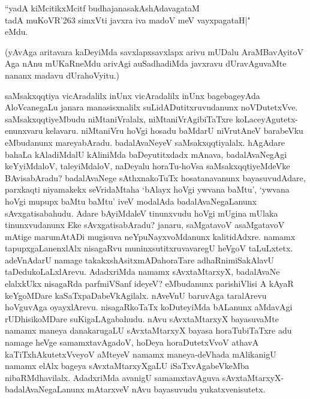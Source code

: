  \begin{shloka}
 ``yadA kiMcitikxMcitf budhajanasakAshAdavagataM \\
 tadA muKoVR\char'263 simxVti javxra iva madoV meV vayxpagataH|"\\
 eMdu.
 \end{shloka}
 
(yAvAga aritavara kaDeyiMda savxlapxsavxlapx arivu mUDalu AraMBavAyitoV Aga nAnu mUKaRneMdu arivAgi auSadhadiMda javxravu dUravAguvaMte nananx madavu dUrahoVyitu.)

saMsakxqqtiya vicAradalilx inUnx vicAradalilx inUnx bagebageyAda AloVcanegaLu janara manasisxnalilx suLidADutitxruvudanunx noVDutetxVve. saMsakxqqtiyeMbudu niMtaniVralalx, niMtaniVrAgibiTaTxre koLaceyAgutetx-enunxvaru kelavaru. niMtaniVru hoVgi hosadu baMdarU niVrutAneV barabeVku eMbudanunx mareyabAradu. badalAvaNeyeV saMsakxqqtiyalalx. hAgAdare bahaLa kAladiMdalU kAliniMda baDeyutitxdadx mAnava, badalAvaNegAgi keYyiMdaloV, taleyiMdaloV, naDeyalu horaTu-hoVsa saMsakxqqtiyeMdeVke BAvisabAradu? badalAvaNege sAthxnakoTuTx hosatanavanunx bayasuvudAdare, parxkaqti niyamakekx seVridaMtaha `bAlayx hoVgi ywvana baMtu', `ywvana hoVgi mupupx baMtu baMtu' iveV modalAda badalAvaNegaLanunx sAvxgatisabahudu. Adare bAyiMdaleV tinunxvudu hoVgi mUgina mUlaka tinunxvudanunx Eke sAvxgatisabAradu? janaru, saMgatavoV asaMgatavoV mAtige marumAtADi mugisuva neYpuNayxvoMdanunx kalitidAdxre. namamx tapupxgaLanenxlAlx nisagaRvu muninxsutitxruvavaregU heVgoV taLuLxtetx. adeVnAdarU namage takakxshAsitxmADahoraTare adhaRnimiSakAlavU taDedukoLaLxlArevu. AdadxriMda namamx sAvxtaMtarxyX, badalAvaNe elalxkUkx nisagaRda parfmiVSanf ideyeV? eMbudanunx parishiVlisi A kAyaR keYgoMDare kaSaTxpaDabeVkAgilalx. nAveVnU baruvAga taralArevu hoVguvAga oyayxlArevu. nisagaRkoTaTx koDuteyiMda bALanunx aMdavAgi rUDhisikoMDare suKigaLAgabahudu. nAvu sAvxtaMtarxyX bayasuvaMte namamx maneya danakarugaLU sAvxtaMtarxyX bayasa horaTubiTaTxre adu namage heVge samamxtavAgadoV, hoDeya horaDutetxVvoV athavA kaTiTxhAkutetxVveyoV aMteyeV namamx maneya-deVhada mAlikanigU namamx elAlx bageya sAvxtaMtarxyXgaLU iSaTxvAgabeVkeMba \-nibaRMdhavilalx. AdadxriMda avanigU samamxtavAguva sAvxtaMtarxyX-badalAvaNegaLanunx mAtarxveV nAvu bayasuvudu yukatxvenisutetx.

